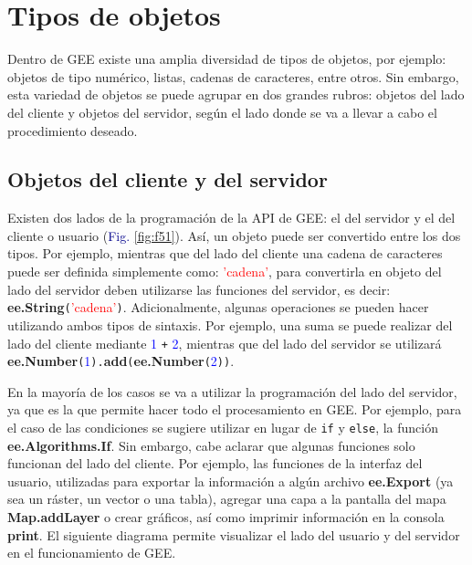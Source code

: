 \documentclass[
  12pt,
  letterpaper,
  twoside]{book}
\newcommand\boldpurple[1]{\textcolor{darkpurple}{\textbf{#1}}}
\begin{document}
\newpage

\hypertarget{tipos-de-objetos}{%
\chapter{Tipos de objetos}\label{tipos-de-objetos}}

Dentro de GEE existe una amplia diversidad de tipos de objetos, por ejemplo: objetos de tipo numérico, listas, cadenas de caracteres, entre otros. Sin embargo, esta variedad de objetos se puede agrupar en dos grandes rubros: objetos del lado del cliente y objetos del servidor, según el lado donde se va a llevar a cabo el procedimiento deseado.

\hypertarget{objetos-del-cliente-y-del-servidor}{%
\section{Objetos del cliente y del servidor}\label{objetos-del-cliente-y-del-servidor}}

Existen dos lados de la programación de la API de GEE: el del servidor y el del cliente o usuario (\textcolor{darkblue}{Fig.} \ref{fig:f51}). Así, un objeto puede ser convertido entre los dos tipos. Por ejemplo, mientras que del lado del cliente una cadena de caracteres puede ser definida simplemente como: \textcolor{red}{'cadena'}, para convertirla en objeto del lado del servidor deben utilizarse las funciones del servidor, es decir: \boldpurple{ee.String}\texttt{(}\textcolor{red}{'cadena'}\texttt{)}. Adicionalmente, algunas operaciones se pueden hacer utilizando ambos tipos de sintaxis. Por ejemplo, una suma se puede realizar del lado del cliente mediante \textcolor{blue}{1} \texttt{+} \textcolor{blue}{2}, mientras que del lado del servidor se utilizará \boldpurple{ee.Number}\texttt{(}\textcolor{blue}{1}\texttt{).}\boldpurple{add}\texttt{(}\boldpurple{ee.Number}\texttt{(}\textcolor{blue}{2}\texttt{))}.

En la mayoría de los casos se va a utilizar la programación del lado del servidor, ya que es la que permite hacer todo el procesamiento en GEE. Por ejemplo, para el caso de las condiciones se sugiere utilizar en lugar de \texttt{if} y \texttt{else}, la función \boldpurple{ee.Algorithms.If}. Sin embargo, cabe aclarar que algunas funciones solo funcionan del lado del cliente. Por ejemplo, las funciones de la interfaz del usuario, utilizadas para exportar la información a algún archivo \boldpurple{ee.Export} (ya sea un ráster, un vector o una tabla), agregar una capa a la pantalla del mapa \boldpurple{Map.addLayer} o crear gráficos, así como imprimir información en la consola \boldpurple{print}. El siguiente diagrama permite visualizar el lado del usuario y del servidor en el funcionamiento de GEE.
\end{document}
